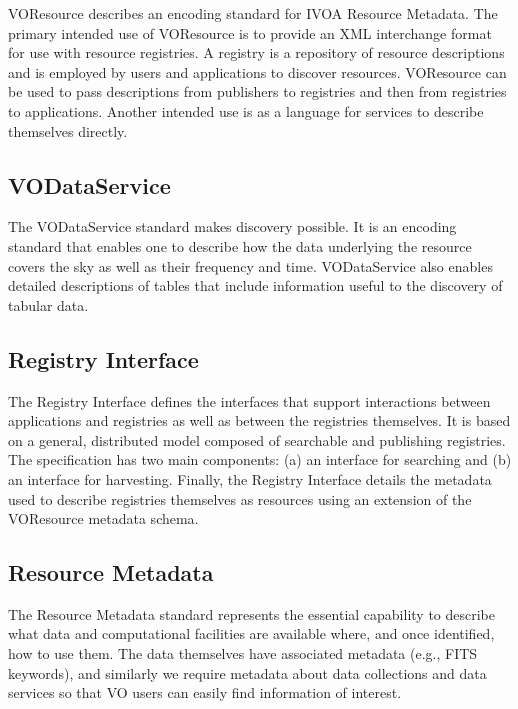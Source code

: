 \documentclass[11pt,letter]{ivoa}
\begin{document}
VOResource \citep{2018ivoa.spec.0625P} describes an encoding standard for IVOA Resource Metadata. The primary intended use of 
VOResource is to provide an XML interchange format for use with resource registries. A registry is 
a repository of resource descriptions and is employed by users and applications to discover resources. 
VOResource can be used to pass descriptions from publishers to registries and then from registries to 
applications. Another intended use is as a language for services to describe themselves directly.

\subsection{VODataService}

The VODataService \citep{2021ivoa.spec.1102D} standard makes discovery possible.  It is an encoding standard that enables one to 
describe how the data underlying the resource covers the sky as well as their frequency and time. 
VODataService also enables detailed descriptions of tables that include information useful to the 
discovery of tabular data. 

\subsection{Registry Interface}

The Registry Interface \citep{2018ivoa.spec.0723D} defines the interfaces that support interactions between applications and 
registries as well as between the registries themselves.  It is based on a general, distributed 
model composed of searchable and publishing registries. The specification has two main components: 
(a) an interface for searching and (b) an interface for harvesting.  Finally, the Registry Interface 
details the metadata used to describe registries themselves as resources using an extension of the 
VOResource metadata schema.

\subsection{Resource Metadata}

The Resource Metadata \citep{2007ivoa.spec.0302H} standard represents the essential capability to describe what data and 
computational facilities are available where, and once identified, how to use them.  The data 
themselves have associated metadata (e.g., FITS keywords), and similarly we require metadata 
about data collections and data services so that VO users can easily find information of interest.  
\end{document}

